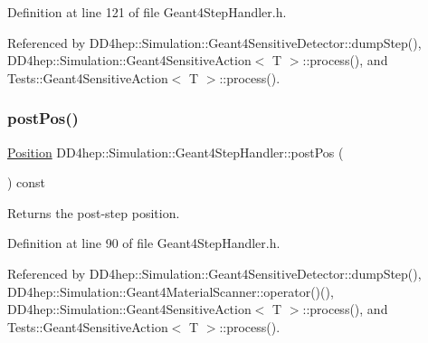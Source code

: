 Definition at line 121 of file Geant4\+Step\+Handler.\+h.



Referenced by D\+D4hep\+::\+Simulation\+::\+Geant4\+Sensitive\+Detector\+::dump\+Step(), D\+D4hep\+::\+Simulation\+::\+Geant4\+Sensitive\+Action$<$ T $>$\+::process(), and Tests\+::\+Geant4\+Sensitive\+Action$<$ T $>$\+::process().

\hypertarget{class_d_d4hep_1_1_simulation_1_1_geant4_step_handler_a41172681a0ca6e6aa21e99df5af11be3}{}\label{class_d_d4hep_1_1_simulation_1_1_geant4_step_handler_a41172681a0ca6e6aa21e99df5af11be3} 
\subsubsection{\texorpdfstring{post\+Pos()}{postPos()}}
{\footnotesize\ttfamily \hyperlink{namespace_d_d4hep_1_1_geometry_a55083902099d03506c6db01b80404900}{Position} D\+D4hep\+::\+Simulation\+::\+Geant4\+Step\+Handler\+::post\+Pos (\begin{DoxyParamCaption}{ }\end{DoxyParamCaption}) const\hspace{0.3cm}{\ttfamily [inline]}}



Returns the post-\/step position. 



Definition at line 90 of file Geant4\+Step\+Handler.\+h.



Referenced by D\+D4hep\+::\+Simulation\+::\+Geant4\+Sensitive\+Detector\+::dump\+Step(), D\+D4hep\+::\+Simulation\+::\+Geant4\+Material\+Scanner\+::operator()(), D\+D4hep\+::\+Simulation\+::\+Geant4\+Sensitive\+Action$<$ T $>$\+::process(), and Tests\+::\+Geant4\+Sensitive\+Action$<$ T $>$\+::process().

\hypertarget{class_d_d4hep_1_1_simulation_1_1_geant4_step_handler_a8724fb0d717e73716f12a30a851a6b3f}{}\label{class_d_d4hep_1_1_simulation_1_1_geant4_step_handler_a8724fb0d717e73716f12a30a851a6b3f} 
